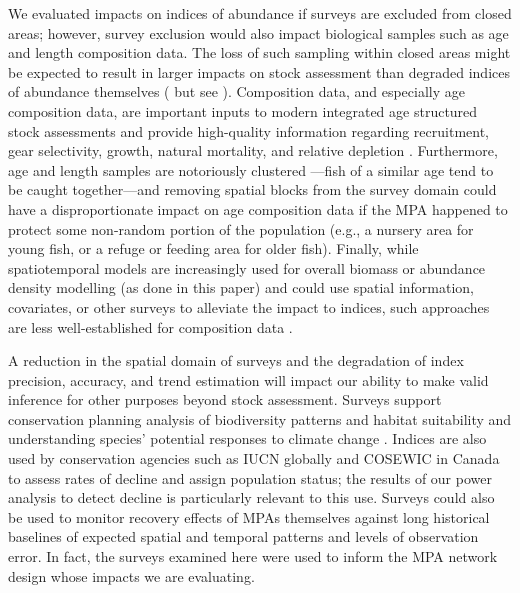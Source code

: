 \documentclass[12pt]{article}
\begin{document}
We evaluated impacts on indices of abundance if surveys are excluded from closed areas; however, survey exclusion would also impact biological samples such as age and length composition data.
The loss of such sampling within closed areas might be expected to result in larger impacts on stock assessment than degraded indices of abundance themselves (\citeauthor{yin2004} \citeyear{yin2004} but see \citeauthor{chen2003} \citeyear{chen2003}).
Composition data, and especially age composition data, are important inputs to modern integrated age structured stock assessments and provide high-quality information regarding recruitment, gear selectivity, growth, natural mortality, and relative depletion \citep{magnusson2007, ono2015}.
Furthermore, age and length samples are notoriously clustered \citep{hilbornwalters1992, francis2011}---fish of a similar age tend to be caught together---and removing spatial blocks from the survey domain could have a disproportionate impact on age composition data if the MPA happened to protect some non-random portion of the population (e.g., a nursery area for young fish, or a refuge or feeding area for older fish).
Finally, while spatiotemporal models are increasingly used for overall biomass or abundance density modelling (as done in this paper) and could use spatial information, covariates, or other surveys to alleviate the impact to indices, such approaches are less well-established for composition data \citep[but see][]{thorsonhaltuch2018}.

A reduction in the spatial domain of surveys and the degradation of index precision, accuracy, and trend estimation will impact our ability to make valid inference for other purposes beyond stock assessment.
Surveys support conservation planning analysis of biodiversity patterns and habitat suitability \citep[e.g.,][]{rubidge2016, thompson2022meps} and understanding species' potential responses to climate change \citep[e.g.,][]{english2021, thompson2023warming}.
Indices are also used by conservation agencies such as IUCN globally \citep{iucn2012} and COSEWIC in Canada \citep{cosewicTable2} to assess rates of decline and assign population status; the results of our power analysis to detect decline is particularly relevant to this use.
Surveys could also be used to monitor recovery effects of MPAs themselves against long historical baselines of expected spatial and temporal patterns and levels of observation error.
In fact, the surveys examined here were used to inform the MPA network design whose impacts we are evaluating.
\end{document}
